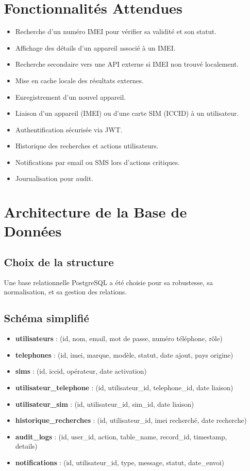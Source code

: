 \documentclass[a4paper,12pt]{article}
\begin{document}
\section{Fonctionnalités Attendues}
\begin{itemize}
    \item Recherche d’un numéro IMEI pour vérifier sa validité et son statut.
    \item Affichage des détails d’un appareil associé à un IMEI.
    \item Recherche secondaire vers une API externe si IMEI non trouvé localement.
    \item Mise en cache locale des résultats externes.
    \item Enregistrement d’un nouvel appareil.
    \item Liaison d’un appareil (IMEI) ou d’une carte SIM (ICCID) à un utilisateur.
    \item Authentification sécurisée via JWT.
    \item Historique des recherches et actions utilisateurs.
    \item Notifications par email ou SMS lors d’actions critiques.
    \item Journalisation pour audit.
\end{itemize}

\section{Architecture de la Base de Données}

\subsection{Choix de la structure}
Une base relationnelle PostgreSQL a été choisie pour sa robustesse, sa normalisation, et sa gestion des relations.

\subsection{Schéma simplifié}

\begin{itemize}
    \item \textbf{utilisateurs} : (id, nom, email, mot de passe, numéro téléphone, rôle)
    \item \textbf{telephones} : (id, imei, marque, modèle, statut, date ajout, pays origine)
    \item \textbf{sims} : (id, iccid, opérateur, date activation)
    \item \textbf{utilisateur\_telephone} : (id, utilisateur\_id, telephone\_id, date liaison)
    \item \textbf{utilisateur\_sim} : (id, utilisateur\_id, sim\_id, date liaison)
    \item \textbf{historique\_recherches} : (id, utilisateur\_id, imei recherché, date recherche)
    \item \textbf{audit\_logs} : (id, user\_id, action, table\_name, record\_id, timestamp, details)
    \item \textbf{notifications} : (id, utilisateur\_id, type, message, statut, date\_envoi)
\end{itemize}
\end{document}

